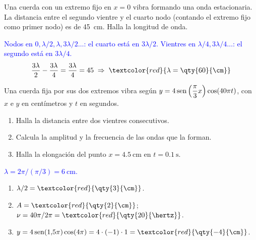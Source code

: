 \begin{exercise}
    Una cuerda con un extremo fijo en \(x = 0\) vibra formando una onda estacionaria. La distancia entre el segundo vientre y
    el cuarto nodo (contando el extremo fijo como primer nodo) es de \qty{45}{\cm}. Halla la longitud de onda.
    \begin{solu}
        \textcolor{blue}{Nodos en \(0, \lambda/2, \lambda, 3\lambda/2\ldots\): el cuarto está en \(3\lambda/2\). Vientres en \(\lambda/4, 3\lambda/4\ldots\): el segundo está en \(3\lambda/4\).}
        \[ \dfrac{3\lambda}{2} - \dfrac{3\lambda}{4} = \dfrac{3\lambda}{4} = 45 \;\Rightarrow\; \textcolor{red}{\lambda = \qty{60}{\cm}} \]
    \end{solu}
\end{exercise}

\begin{exercise}
    Una cuerda fija por sus dos extremos vibra según \(y = 4\operatorname{sen}\left(\dfrac{\pi}{3}x\right)\cos(40\pi t)\), con \(x\) e \(y\)
    en centímetros y \(t\) en segundos.
    \begin{enumerate}[label=\letraminuscula]
        \item Halla la distancia entre dos vientres consecutivos.
        \item Calcula la amplitud y la frecuencia de las ondas que la forman.
        \item Halla la elongación del punto \(x = \qty{4.5}{\cm}\) en \(t = \qty{0.1}{\second}\).
    \end{enumerate}
    \begin{solu}
        \textcolor{blue}{\(\lambda = 2\pi/(\pi/3) = \qty{6}{\cm}\).}
        \begin{enumerate}[label=\letraminuscula]
            \item \(\lambda/2 = \textcolor{red}{\qty{3}{\cm}}\).
            \item \(A = \textcolor{red}{\qty{2}{\cm}}\); \(\nu = 40\pi/2\pi = \textcolor{red}{\qty{20}{\hertz}}\).
            \item \(y = 4\sen(1{,}5\pi)\cos(4\pi) = 4\cdot(-1)\cdot 1 = \textcolor{red}{\qty{-4}{\cm}}\).
        \end{enumerate}
    \end{solu}
\end{exercise}

